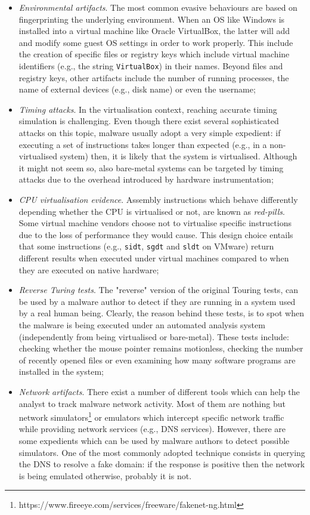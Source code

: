 \documentclass[LaM,binding=0.6cm]{sapthesis}
\begin{document}
\begin{itemize}
\item \textit{Environmental artifacts}. The most common evasive behaviours are based on fingerprinting the underlying environment. When an OS like Windows is installed into a virtual machine like Oracle VirtualBox, the latter will add and modify some guest OS settings in order to work properly. This include the creation of specific files or registry keys which include virtual machine identifiers (e.g., the string \texttt{VirtualBox}) in their names. Beyond files and registry keys, other artifacts include the number of running processes, the name of external devices (e.g., disk name) or even the username\cite{lindorfer2011detecting};
\item \textit{Timing attacks}. In the virtualisation context, reaching accurate timing simulation is challenging. Even though there exist several sophisticated attacks on this topic, malware usually adopt a very simple expedient: if executing a set of instructions takes longer than expected (e.g., in a non-virtualised system) then, it is likely that the system is virtualised. Although it might not seem so, also bare-metal systems can be targeted by timing attacks due to the overhead introduced by hardware instrumentation\cite{spensky2016phi};
\item \textit{CPU virtualisation evidence}. Assembly instructions which behave differently depending whether the CPU is virtualised or not, are known as \textit{red-pills}. Some virtual machine vendors choose not to virtualise specific instructions due to the loss of performance they would cause. This design choice entails that some instructions (e.g., \texttt{sidt}, \texttt{sgdt} and \texttt{sldt} on VMware) return different results when executed under virtual machines compared to when they are executed on native hardware;
\item \textit{Reverse Turing tests}. The "reverse" version of the original Touring tests\cite{turing2009computing}, can be used by a malware author to detect if they are running in a system used by a real human being\cite{miramirkhani2017spotless}. Clearly, the reason behind these tests, is to spot when the malware is being executed under an automated analysis system (independently from being virtualised or bare-metal). These tests include: checking whether the mouse pointer remains motionless, checking the number of recently opened files or even examining how many software programs are installed in the system;
\item \textit{Network artifacts}. There exist a number of different tools which can help the analyst to track malware network activity. Most of them are nothing but network simulators\footnote{https://www.fireeye.com/services/freeware/fakenet-ng.html} or emulators which intercept specific network traffic while providing network services (e.g., DNS services). However, there are some expedients which can be used by malware authors to detect possible simulators. One of the most commonly adopted technique consists in querying the DNS to resolve a fake domain: if the response is positive then the network is being emulated otherwise, probably it is not.
\end{itemize}
\end{document}
